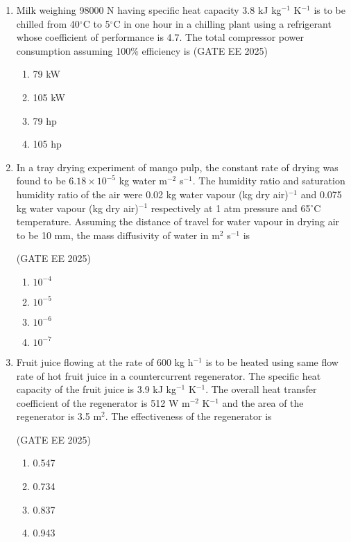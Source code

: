 \documentclass[journal,12pt,onecolumn]{IEEEtran}
\theoremstyle{remark}
\begin{document}
\begin{enumerate}
\item Milk weighing 98000 N having specific heat capacity 3.8 kJ kg$^{-1}$ K$^{-1}$ is to be chilled from 40$^\circ$C to 5$^\circ$C in one hour in a chilling plant using a refrigerant whose coefficient of performance is 4.7. The total compressor power consumption assuming 100\% efficiency is
\hfill(GATE EE 2025)
\begin{multicols}{4}
\begin{enumerate}
\item 79 kW
\item 105 kW
\item 79 hp
\item 105 hp
\end{enumerate}
\end{multicols}
\newpage
\item In a tray drying experiment of mango pulp, the constant rate of drying was found to be $6.18 \times 10^{-5}$ kg water m$^{-2}$ s$^{-1}$. The humidity ratio and saturation humidity ratio of the air were 0.02 kg water vapour (kg dry air)$^{-1}$ and 0.075 kg water vapour (kg dry air)$^{-1}$ respectively at 1 atm pressure and 65$^\circ$C temperature. Assuming the distance of travel for water vapour in drying air to be 10 mm, the mass diffusivity of water in m$^{2}$ s$^{-1}$ is

\hfill(GATE EE 2025)

\begin{multicols}{4}
\begin{enumerate}
\item $10^{-4}$
\item $10^{-5}$
\item $10^{-6}$
\item $10^{-7}$
\end{enumerate}
\end{multicols}

\item Fruit juice flowing at the rate of 600 kg h$^{-1}$ is to be heated using same flow rate of hot fruit juice in a countercurrent regenerator. The specific heat capacity of the fruit juice is 3.9 kJ kg$^{-1}$ K$^{-1}$. The overall heat transfer coefficient of the regenerator is 512 W m$^{-2}$ K$^{-1}$ and the area of the regenerator is 3.5 m$^{2}$. The effectiveness of the regenerator is

\hfill(GATE EE 2025)

\begin{multicols}{4}
\begin{enumerate}
\item 0.547
\item 0.734
\item 0.837
\item 0.943
\end{enumerate}
\end{multicols}


\end{enumerate}
\end{document}
